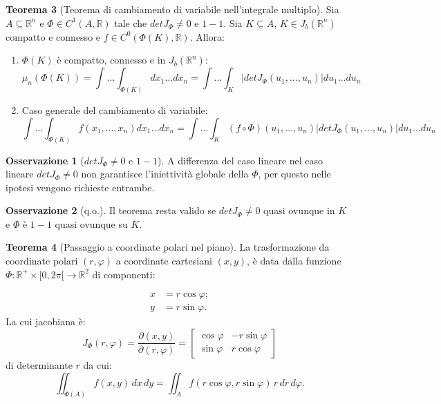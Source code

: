 \documentclass[leqno]{article}
\theoremstyle{definition}
\numberwithin{equation}{section}
\newtheorem{theorem}{Teorema}[section]
\newtheorem{observation}[theorem]{Osservazione}
\theoremstyle{remark}
\begin{document}
	\begin{theorem}[Teorema di cambiamento di variabile nell'integrale multiplo]
		Sia $A\subseteq \mathbb{R}^n$ e $\Phi \in C^1(A,\mathbb{R})$ tale che $detJ_\Phi \neq 0$ e $1-1$. Sia $K\subseteq A$, $K\in J_b(\mathbb{R}^n)$ compatto e connesso e $f\in C^0(\Phi(K),\mathbb{R})$. Allora:
		\begin{enumerate}
			\item $\Phi(K)$ è compatto, connesso e in $J_b(\mathbb{R}^n)$:
			\begin{equation}
				\mu_n(\Phi(K))=\int \dots \int_{\Phi(K)}dx_1 \dots dx_n=\int \dots \int_K\left| detJ_\Phi (u_1,\dots ,u_n)\right| du_1\dots du_n
			\end{equation}
			\item Caso generale del cambiamento di variabile:
			\begin{equation}
				\int \dots \int_{\Phi(K)}f(x_1,\dots ,x_n)dx_1\dots dx_n=\int \dots \int_K(f \circ \Phi)(u_1, \dots, u_n)\left| detJ_\Phi (u_1,\dots ,u_n)\right| du_1\dots du_n
			\end{equation}
		\end{enumerate}
		\begin{observation}[$detJ_\Phi \neq 0$ e $1-1$]
			A differenza del caso lineare nel caso lineare $detJ_\Phi \neq 0$ non garantisce l'iniettività globale della $\Phi$, per questo nelle ipotesi vengono richieste entrambe.
		\end{observation}
		\begin{observation}[q.o.]
			Il teorema resta valido se $detJ_\Phi \neq 0$ quasi ovunque in $K$ e $\Phi$ è $1-1$ quasi ovunque su $K$.    
		\end{observation}
	\end{theorem}
	\begin{theorem}[Passaggio a coordinate polari nel piano]
		
		La trasformazione da coordinate polari $(r,\varphi)$ a coordinate cartesiani $(x,y)$, è data dalla funzione $\Phi : \mathbb{R}^+ \times [0,2\pi[ \to \mathbb{R}^2$ di componenti: 
		
		\begin{align*} 
			x&=r\cos \varphi ;\\y&=r\sin \varphi .
		\end{align*}
		La cui jacobiana è:
		\begin{equation}
			J _{\Phi} (r,\varphi )=\dfrac{\partial(x,y)}{\partial(r,\varphi)}={\begin{bmatrix}\cos \varphi &-r\sin \varphi \\\sin \varphi &r\cos \varphi \end{bmatrix}}
		\end{equation}
		di determinante $r$ da cui:
		\begin{equation}
			\iint _{\Phi(A)}f(x,y)\,dx\,dy=\iint _{A}f(r\cos \varphi ,r\sin \varphi )\,r\,dr\,d\varphi .
		\end{equation}
	\end{theorem}
\end{document}
